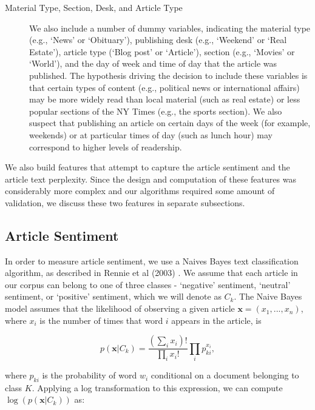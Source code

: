\documentclass[fleqn,12pt]{SelfArx} %
\begin{document}
\begin{description}
	\item[Material Type, Section, Desk, and Article Type] We also include a number of dummy variables, indicating the material type (e.g., `News' or `Obituary'), publishing desk (e.g., `Weekend' or `Real Estate'), article type (`Blog post' or `Article'), section (e.g., `Movies' or `World'), and the day of week and time of day that the article was published. The hypothesis driving the decision to include these variables is that certain types of content (e.g., political news or international affairs) may be more widely read than local material (such as real estate) or less popular sections of the NY Times (e.g., the sports section). We also suspect that publishing an article on certain days of the week (for example, weekends) or at particular times of day (such as lunch hour) may correspond to higher levels of readership.
	
\end{description}

We also build features that attempt to capture the article sentiment and the article text perplexity. Since the design and computation of these features was considerably more complex and our algorithms required some amount of validation, we discuss these two features in separate subsections.

\subsection{Article Sentiment}

In order to measure article sentiment, we use a Naives Bayes text classification algorithm, as described in Rennie et al (2003) \cite{rennie2003tackling}. We assume that each article in our corpus can belong to one of three classes - `negative' sentiment, `neutral' sentiment, or `positive' sentiment, which we will denote as $C_k$. The Naive Bayes model assumes that the likelihood of observing a given article $\mathbf{x} = (x_1, ..., x_n)$, where $x_i$ is the number of times that word $i$ appears in the article, is 

\begin{equation}
p(\mathbf{x}|C_k) = \frac{\left ( \sum_i x_i \right )!}{\prod_i x_i !} \prod_i p_{ki}^{x_i},
\end{equation} 

\noindent where $p_{ki}$ is the probability of word $w_i$ conditional on a document belonging to class $K$. Applying a log transformation to this expression, we can compute $\log(p(\mathbf{x}|C_k))$ as:
\end{document}
